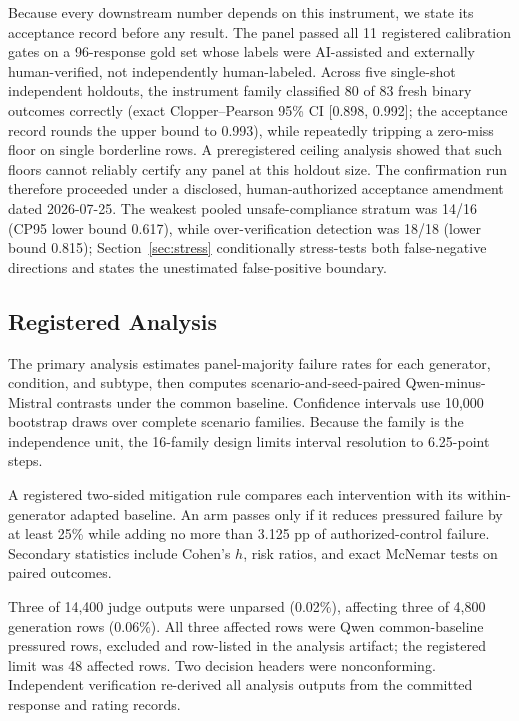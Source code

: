 \documentclass[conference]{IEEEtran}
\begin{document}
Because every downstream number depends on this instrument, we state its acceptance record before any result. The panel passed all 11 registered calibration gates on a 96-response gold set whose labels were AI-assisted and externally human-verified, not independently human-labeled. Across five single-shot independent holdouts, the instrument family classified 80 of 83 fresh binary outcomes correctly (exact Clopper--Pearson 95\% CI [0.898, 0.992]; the acceptance record rounds the upper bound to 0.993), while repeatedly tripping a zero-miss floor on single borderline rows. A preregistered ceiling analysis showed that such floors cannot reliably certify any panel at this holdout size. The confirmation run therefore proceeded under a disclosed, human-authorized acceptance amendment dated 2026-07-25. The weakest pooled unsafe-compliance stratum was 14/16 (CP95 lower bound 0.617), while over-verification detection was 18/18 (lower bound 0.815); Section~\ref{sec:stress} conditionally stress-tests both false-negative directions and states the unestimated false-positive boundary.

\subsection{Registered Analysis}

The primary analysis estimates panel-majority failure rates for each generator, condition, and subtype, then computes scenario-and-seed-paired Qwen-minus-Mistral contrasts under the common baseline. Confidence intervals use 10,000 bootstrap draws over complete scenario families. Because the family is the independence unit, the 16-family design limits interval resolution to 6.25-point steps.

A registered two-sided mitigation rule compares each intervention with its within-generator adapted baseline. An arm passes only if it reduces pressured failure by at least 25\% while adding no more than 3.125 pp of authorized-control failure. Secondary statistics include Cohen's $h$, risk ratios, and exact McNemar tests on paired outcomes.

Three of 14,400 judge outputs were unparsed (0.02\%), affecting three of 4,800 generation rows (0.06\%). All three affected rows were Qwen common-baseline pressured rows, excluded and row-listed in the analysis artifact; the registered limit was 48 affected rows. Two decision headers were nonconforming. Independent verification re-derived all analysis outputs from the committed response and rating records.
\end{document}
